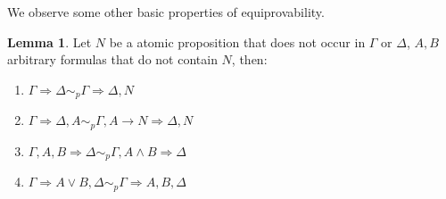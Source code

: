 \documentclass[a4paper,12pt]{article}
\theoremstyle{definition}
\theoremstyle{definition}
\theoremstyle{definition}
\newtheorem{lemma}[theorem]{Lemma}
\theoremstyle{definition}
\theoremstyle{definition}
\theoremstyle{definition}
\begin{document}
		We observe some other basic properties of equiprovability.
	
	\begin{lemma}\label{ep2}
		Let $N$ be a atomic proposition that does not occur in $\Gamma$ or $\Delta$, $A, B$ arbitrary formulas that do not contain $N$, then:
		\begin{enumerate}
			\item $\Gamma\Rightarrow\Delta\sim_p\Gamma\Rightarrow\Delta, N$
			\item $\Gamma\Rightarrow\Delta, A\sim_p\Gamma, A\to N\Rightarrow \Delta, N$
			\item $\Gamma, A, B\Rightarrow\Delta\sim_p\Gamma, A\wedge B\Rightarrow\Delta$
			\item $\Gamma\Rightarrow A\vee B,\Delta\sim_p\Gamma\Rightarrow A, B,\Delta$
		\end{enumerate} 
	\end{lemma}
\end{document}
